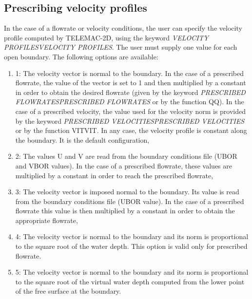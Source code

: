 \subsection{ Prescribing velocity profiles}

 In the case of a flowrate or velocity conditions, the user can specify the velocity profile computed by TELEMAC-2D, using the keyword \textit{VELOCITY PROFILESVELOCITY PROFILES}. The user must supply one value for each open boundary. The following options are available:

\begin{enumerate}
\item  1: The velocity vector is normal to the boundary. In the case of a prescribed flowrate, the value of the vector is set to 1 and then multiplied by a constant in order to obtain the desired flowrate (given by the keyword \textit{PRESCRIBED FLOWRATESPRESCRIBED FLOWRATES} or by the function QQ). In the case of a prescribed velocity, the value used for the velocity norm is provided by the keyword \textit{PRESCRIBED VELOCITIESPRESCRIBED VELOCITIES} or by the function VITVIT. In any case, the velocity profile is constant along the boundary. It is the default configuration,

\item  2: The values U and V are read from the boundary conditions file (UBOR and VBOR values). In the case of a prescribed flowrate, these values are multiplied by a constant in order to reach the prescribed flowrate,

\item  3: The velocity vector is imposed normal to the boundary. Its value is read from the boundary conditions file (UBOR value). In the case of a prescribed flowrate this value is then multiplied by a constant in order to obtain the appropriate flowrate,

\item  4: The velocity vector is normal to the boundary and its norm is proportional to the square root of the water depth. This option is valid only for prescribed flowrate.

\item  5: The velocity vector is normal to the boundary and its norm is proportional to the square root of the virtual water depth computed from the lower point of the free surface at the boundary.
\end{enumerate}

